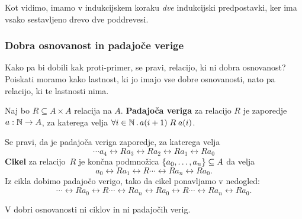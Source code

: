 Kot vidimo, imamo v indukcijskem koraku \emph{dve} indukcijski predpostavki, ker ima vsako
sestavljeno drevo dve poddrevesi.


\subsubsection{Dobra osnovanost in padajoče verige}

Kako pa bi dobili kak proti-primer, se pravi, relacijo, ki ni dobra osnovanost? Poiskati
moramo kako lastnost, ki jo imajo vse dobre osnovanosti, nato pa relacijo, ki te lastnosti nima.

\begin{definicija}
  Naj bo $R \subseteq A \times A$ relacija na $A$. \textbf{Padajoča veriga} za relacijo $R$
  je zaporedje $a : \mathbb{N} \to A$, za katerega velja $\forall i \in \mathbb{N} \,.\, a(i+1) \mathrel{R} a(i)$.
\end{definicija}

Se pravi, da je padajoča veriga zaporedje, za katerega velja
%
\begin{equation*}
  \cdots a_4 \rel{R} a_3 \rel{R} a_2 \rel{R} a_1 \rel{R} a_0
\end{equation*}
%
\textbf{Cikel} za relacijo~$R$ je končna podmnožica $\left\{a_0, \ldots, a_n\right\} \subseteq A$ da velja
%
\begin{equation*}
  a_0 \rel{R} a_1 \rel{R} \cdots \rel{R} a_n \rel{R} a_0.
\end{equation*}
%
Iz cikla dobimo padajočo verigo, tako da cikel ponavljamo v nedogled:
%
\begin{equation*}
  \cdots \rel{R} a_0 \rel{R} \cdots \rel{R} a_n
         \rel{R} a_0 \rel{R} \cdots \rel{R} a_n \rel{R} a_0.
\end{equation*}

\begin{lema}
  V dobri osnovanosti ni ciklov in ni padajočih verig.
\end{lema}

